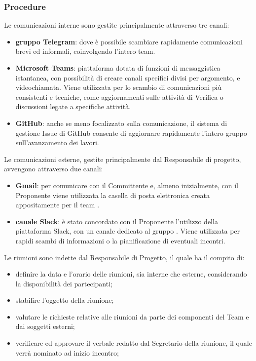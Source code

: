 		\subsubsection{Procedure}
			Le comunicazioni interne sono gestite principalmente attraverso tre canali:
			\begin{itemize}
				\item \textbf{gruppo Telegram}: dove è possibile scambiare rapidamente comunicazioni brevi ed informali, coinvolgendo l'intero team.
				\item \textbf{Microsoft Teams}: piattaforma dotata di funzioni di messaggistica istantanea, con possibilità di creare canali specifici divisi per argomento, e videochiamata. Viene utilizzata per lo scambio di comunicazioni più consistenti e tecniche, come aggiornamenti sulle attività di Verifica o discussioni legate a specifiche attività.
				\item \textbf{GitHub}: anche se meno focalizzato sulla comunicazione, il sistema di gestione Issue di GitHub consente di aggiornare rapidamente l'intero gruppo sull'avanzamento dei lavori.
			\end{itemize}
			Le comunicazioni esterne, gestite principalmente dal Responsabile di progetto, avvengono attraverso due canali:
			\begin{itemize}
				\item \textbf{Gmail}: per comunicare con il Committente e, almeno inizialmente, con il Proponente viene utilizzata la casella di posta elettronica creata appositamente per il team \Gruppo{}.
				\item \textbf{canale Slack}: è stato concordato con il Proponente \Proponente{} l'utilizzo della piattaforma Slack, con un canale dedicato al gruppo \Gruppo{}. Viene utilizzata per rapidi scambi di informazioni o la pianificazione di eventuali incontri.
			\end{itemize}
			Le riunioni sono indette dal Responsabile di Progetto, il quale ha il compito di:
			\begin{itemize}
				\item definire la data e l'orario delle riunioni, sia interne che esterne, considerando la disponibilità dei partecipanti;
				\item stabilire l'oggetto della riunione;
				\item valutare le richieste relative alle riunioni da parte dei componenti del Team \Gruppo{} e dai soggetti esterni;
				\item verificare ed approvare il verbale redatto dal Segretario della riunione, il quale verrà nominato ad inizio incontro;
			\end{itemize}
